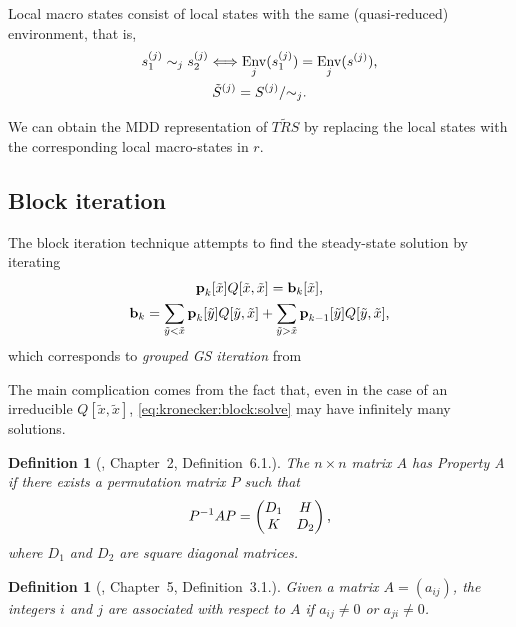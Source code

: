 \documentclass[a4paper,11pt,twoside,openright]{memoir}
\renewcommand*{\vec}[1]{\boldsymbol{\mathrm{#1}}}
\newcommand*{\TRS}{\textit{TRS}}
\newcommand*{\macroS}{}\let\macroS\tilde
\newcommand*{\macroStates}{}\let\macroStates\widetilde
\newcommand*{\macroTRS}{\macroStates{\TRS}}
\DeclareMathOperator{\Env}{Env}
\theoremstyle{my}
\newtheorem{dfn}[thm]{Definition}
\begin{document}
Local macro states consist of local states with the same
(quasi-reduced) environment, that is,
\begin{gather}
  s^{(j)}_1 \sim_j s^{(j)}_2 \Longleftrightarrow \Env_j(s^{(j)}_1) =
  \Env_j(s^{(j)}) \text, \\
  \macroS{S}^{(j)} = S^{(j)} / {\sim}_j \text.
\end{gather}

We can obtain the MDD representation of $\macroTRS$ by replacing the
local states with the corresponding local macro-states in $r$.

\subsection{Block iteration}

The block iteration technique \citep{DBLP:journals/tse/Buchholz99}
attempts to find the steady-state solution by iterating
\begin{gather}
  \vec{p}_k[\macroS{x}] Q[\macroS{x}, \macroS{x}] =
  \vec{b}_k[\macroS{x}] \text, \label{eq:kronecker:block:solve} \\
  \vec{b}_k = \sum_{\macroS{y} < \macroS{x}} \vec{p}_k[\macroS{y}]
  Q[\macroS{y}, \macroS{x}] + \sum_{\macroS{y} > \macroS{x}}
  \vec{p}_{k - 1}[\macroS{y}] Q[\macroS{y}, \macroS{x}] \text,
\end{gather}
which corresponds to \emph{grouped GS iteration} from 

The main complication comes from the fact that, even in the case of an
irreducible $Q[\macroS{x}, \macroS{x}]$,
\eqref{eq:kronecker:block:solve} may have infinitely many solutions.

\begin{dfn}[\citet{young1971iterative}, Chapter~2, Definition~6.1.]
  The $n \times n$ matrix $A$ has \emph{Property A} if there exists a
  permutation matrix $P$ such that
  \begin{align}
    P^{-1} A P = \begin{pmatrix}
      D_1 & H \\ K & D_2
    \end{pmatrix} \text,
  \end{align}
  where $D_1$ and $D_2$ are square diagonal matrices.
\end{dfn}

\begin{dfn}[\citet{young1971iterative}, Chapter~5, Definition~3.1.]
  Given a matrix $A = (a_{ij})$, the integers $i$ and $j$ are
  associated with respect to $A$ if $a_{ij} \ne 0$ or $a_{ji} \ne 0$.
\end{dfn}
\end{document}

